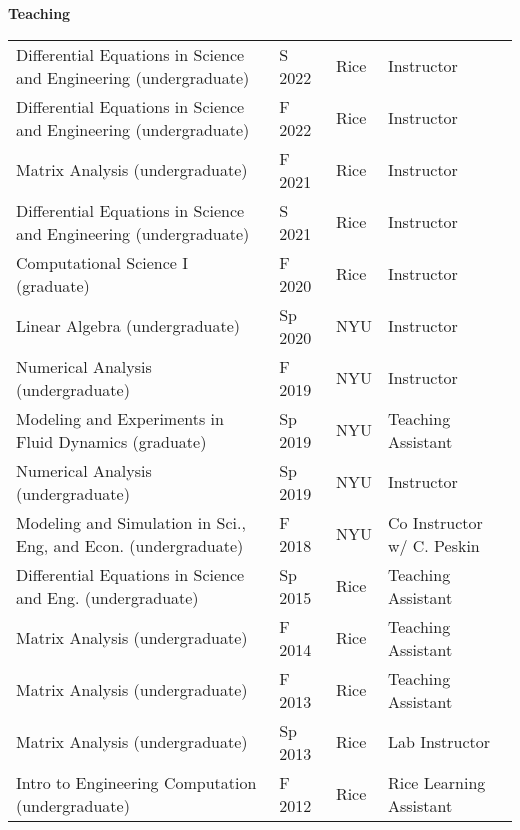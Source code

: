 \documentclass{article} %
\begin{document}
\vspace{0.5cm}
\noindent
\newpage
{\bf \large Teaching}

\vspace{0.25cm}
\begin{tabular}{ l  l  l  l  }
Differential Equations in Science and Engineering (undergraduate) & S 2022 & Rice & Instructor \\
Differential Equations in Science and Engineering (undergraduate) & F 2022 & Rice & Instructor \\
Matrix Analysis (undergraduate) & F 2021 & Rice & Instructor \\
Differential Equations in Science and Engineering (undergraduate) & S 2021 & Rice & Instructor \\
Computational Science I (graduate) & F 2020 & Rice & Instructor \\
Linear Algebra (undergraduate) & Sp 2020 & NYU & Instructor \\
Numerical Analysis (undergraduate) & F 2019 & NYU & Instructor \\
Modeling and Experiments in Fluid Dynamics (graduate) & Sp 2019 & NYU & Teaching Assistant \\
Numerical Analysis (undergraduate) & Sp 2019 & NYU & Instructor \\
Modeling and Simulation in Sci., Eng, and Econ. (undergraduate) & F 2018 & NYU & Co Instructor w/ C. Peskin \\
Differential Equations in Science and Eng. (undergraduate) & Sp 2015 & Rice & Teaching Assistant \\
Matrix Analysis (undergraduate) & F 2014 & Rice & Teaching Assistant \\
Matrix Analysis (undergraduate) & F 2013 & Rice & Teaching Assistant \\
Matrix Analysis (undergraduate) & Sp 2013 & Rice & Lab Instructor \\
Intro to Engineering Computation (undergraduate)  & F 2012 & Rice & Rice Learning Assistant  \\
\end{tabular}
\end{document}
